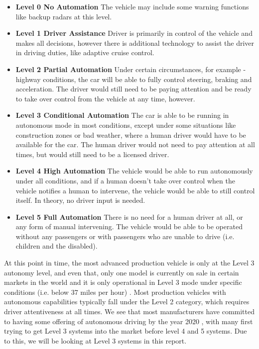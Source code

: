 \documentclass{sigchi}
\begin{document}
\begin{itemize}
\item \textbf{Level 0 No Automation}
\newline
The vehicle may include some warning functions like backup radars at this level.
\item \textbf{Level 1 Driver Assistance}
\newline Driver is primarily in control of the vehicle and makes all decisions, however there is additional technology to assist the driver in driving duties, like adaptive cruise control.
\item \textbf{Level 2 Partial Automation}
\newline
Under certain circumstances, for example - highway conditions, the car will be able to fully control steering, braking and acceleration. The driver would still need to be paying attention and be ready to take over control from the vehicle at any time, however.
\item \textbf{Level 3 Conditional Automation}
\newline The car is able to be running in autonomous mode in most conditions, except under some situations like construction zones or bad weather, where a human driver would have to be available for the car. The human driver would not need to pay attention at all times, but would still need to be a licensed driver.
\item \textbf{Level 4 High Automation}
\newline The vehicle would be able to run autonomously under all conditions, and if a human doesn't take over control when the vehicle notifies a human to intervene, the vehicle would be able to still control itself. In theory, no driver input is needed.
\item \textbf{Level 5 Full Automation}
There is no need for a human driver at all, or any form of manual intervening. The vehicle would be able to be operated without any passengers or with passengers who are unable to drive (i.e. children and the disabled).
\newline
\end{itemize}

At this point in time, the most advanced production vehicle is only at the Level 3 autonomy level, and even that, only one model is currently on sale in certain markets in the world and it is only operational in Level 3 mode under specific conditions (i.e. below 37 miles per hour) \cite{baldwin_2017}. Most production vehicles with autonomous capabilities typically fall under the Level 2 category, which requires driver attentiveness at all times. We see that most manufacturers have committed to having some offering of autonomous driving by the year 2020 \cite{fagella_2017}, with many first trying to get Level 3 systems into the market before level 4 and 5 systems. Due to this, we will be looking at Level 3 systems in this report.
\end{document}
